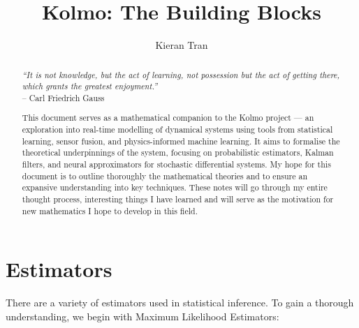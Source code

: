 \documentclass[12pt]{article}
\title{Kolmo: The Building Blocks}
\author{Kieran Tran}
\begin{document}
\maketitle

\begin{abstract}
\textit{“It is not knowledge, but the act of learning, not possession but the act of getting there, which grants the greatest enjoyment.”}  
\\\hfill -- Carl Friedrich Gauss

\vspace{1em}
This document serves as a mathematical companion to the Kolmo project — an exploration into real-time modelling of dynamical systems using tools from statistical learning, sensor fusion, and physics-informed machine learning. It aims to formalise the theoretical underpinnings of the system, focusing on probabilistic estimators, Kalman filters, and neural approximators for stochastic differential systems. My hope for this document is to outline thoroughly the mathematical theories and to ensure an expansive understanding into key techniques. These notes will go through my entire thought process, interesting things I have learned and will serve as the motivation for new mathematics I hope to develop in this field. 
\end{abstract}

\section{Estimators}
There are a variety of estimators used in statistical inference. To gain a thorough understanding, we begin with Maximum Likelihood Estimators: \\
\end{document}
